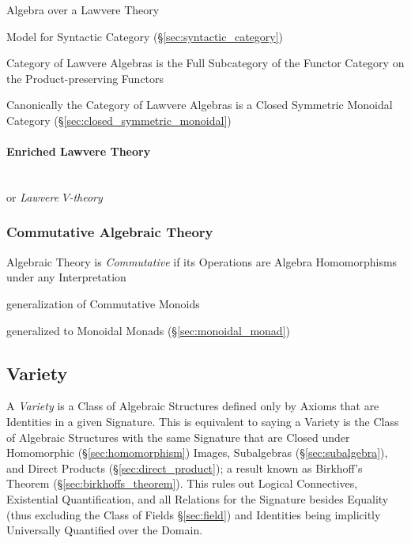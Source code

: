 Algebra over a Lawvere Theory

Model for Syntactic Category (\S\ref{sec:syntactic_category})

Category of Lawvere Algebras is the Full Subcategory of the Functor
Category on the Product-preserving Functors %

Canonically the Category of Lawvere Algebras is a Closed Symmetric
Monoidal Category (\S\ref{sec:closed_symmetric_monoidal})



\paragraph{Enriched Lawvere Theory}\label{sec:enriched_lawvere}
\cite{hyland-power06}
\hfill \\

or \emph{Lawvere $V$-theory}



\subsubsection{Commutative Algebraic Theory}
\label{sec:commutative_algebraic_theory}

Algebraic Theory is \emph{Commutative} if its Operations are Algebra
Homomorphisms under any Interpretation

generalization of Commutative Monoids

generalized to Monoidal Monads (\S\ref{sec:monoidal_monad})



\subsection{Variety}\label{sec:variety}

A \emph{Variety} is a Class of Algebraic Structures defined only by
Axioms that are Identities in a given Signature. This is equivalent to
saying a Variety is the Class of Algebraic Structures with the same
Signature that are Closed under Homomorphic (\S\ref{sec:homomorphism})
Images, Subalgebras (\S\ref{sec:subalgebra}), and Direct Products
(\S\ref{sec:direct_product}); a result known as Birkhoff's Theorem
(\S\ref{sec:birkhoffs_theorem}). This rules out Logical Connectives,
Existential Quantification, and all Relations for the Signature
besides Equality (thus excluding the Class of Fields
\S\ref{sec:field}) and Identities being implicitly Universally
Quantified over the Domain.

